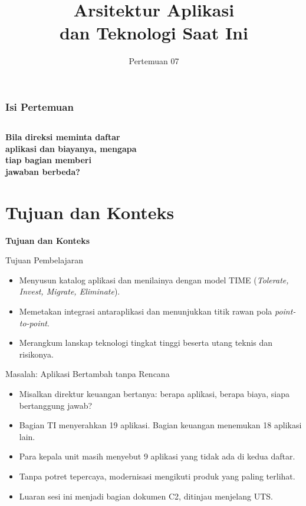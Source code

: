 \documentclass[aspectratio=169, table, 12pt]{beamer}
\title{\Huge Arsitektur Aplikasi\\ \vspace{10pt} dan Teknologi Saat Ini}
\date{Pertemuan 07}
\begin{document}
\begin{frame}
  \titlepage
\end{frame}

\begin{frame}
  \frametitle{Isi Pertemuan}
  \vspace{14pt}
  \begin{columns}[t]
    {\small\tableofcontents[sections={1-3}]}

    {\small\tableofcontents[sections={4-5}]}
  \end{columns}
\end{frame}

\begin{frame}{\hfill}
  \centering
  \Huge{\textbf{Bila direksi meminta daftar\\aplikasi dan biayanya, mengapa\\tiap bagian memberi\\jawaban berbeda?}}
\end{frame}

\section{Tujuan dan Konteks}

\begin{frame}{\hfill}
  \centering
  \Huge{\textbf{Tujuan dan Konteks}}
\end{frame}

\begin{frame}{{\Large Tujuan Pembelajaran}}
  \vspace{10pt}
  \begin{itemize}
    \item Menyusun katalog aplikasi dan menilainya dengan model TIME (\textit{Tolerate, Invest,
          Migrate, Eliminate}).
    \item Memetakan integrasi antaraplikasi dan menunjukkan titik rawan pola
          \textit{point-to-point}.
    \item Merangkum lanskap teknologi tingkat tinggi beserta utang teknis dan risikonya.
  \end{itemize}
\end{frame}

\begin{frame}{{\Large Masalah: Aplikasi Bertambah tanpa Rencana}}
  \vspace{10pt}
  \begin{itemize}
    \item Misalkan direktur keuangan bertanya: berapa aplikasi, berapa biaya, siapa bertanggung jawab?
    \item Bagian TI menyerahkan 19 aplikasi. Bagian keuangan menemukan 18 aplikasi lain.
    \item Para kepala unit masih menyebut 9 aplikasi yang tidak ada di kedua daftar.
    \item Tanpa potret tepercaya, modernisasi mengikuti produk yang paling terlihat.
    \item Luaran sesi ini menjadi bagian dokumen C2, ditinjau menjelang UTS.
  \end{itemize}
\end{frame}
\end{document}
